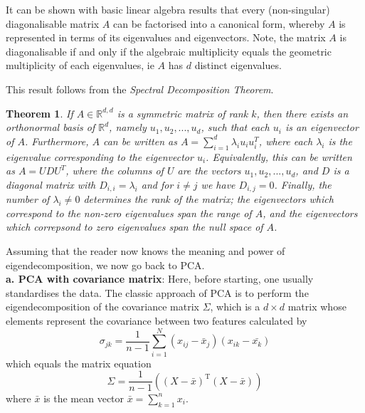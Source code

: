 \documentclass[journal, a4paper]{IEEEtran}
\newtheorem{theorem}{Theorem}[section]
\begin{document}
It can be shown with basic linear algebra results that every (non-singular) diagonalisable matrix \( A \) can be factorised into a canonical form, whereby \( A \) is represented in terms of its eigenvalues and eigenvectors.
Note, the matrix \( A \) is diagonalisable if and only if the algebraic multiplicity equals the geometric multiplicity of each eigenvalues, ie \( A \) has \( d \) distinct eigenvalues.

This result follows from the \textit{Spectral Decomposition Theorem}. 
\begin{theorem}\label{spectralthm}
	If \( A \in \mathbb{R}^{d,d}\) is a symmetric matrix of rank \( k \), then there exists an orthonormal basis of \( \mathbb{R}^d \), namely \( u_{1}, u_{2}, ..., u_{d} \), such that each \( u_{i} \) is an eigenvector of \( A \). Furthermore, \( A \) can be written as \( A = \sum_{i=1}^{d} \lambda_{i} u_{i} u_{i}^T \), where each \( \lambda_{i} \) is the eigenvalue corresponding to the eigenvector \( u_{i} \). Equivalently, this can be written as \( A = U D U^T \), where the columns of \( U \) are the vectors \( u_{1}, u_{2}, ..., u_{d} \), and \( D \) is a diagonal matrix with \( D_{i,i} = \lambda_{i} \) and for \( i \neq j \) we have \( D_{i,j} = 0 \). Finally, the number of \( \lambda_{i} \neq 0 \) determines the rank of the matrix; the eigenvectors which correspond to the non-zero eigenvalues span the range of \( A \), and the eigenvectors which correpsond to zero eigenvalues span the null space of \( A \).
\end{theorem}

Assuming that the reader now knows the meaning and power of eigendecomposition, we now go back to PCA.\\
\textbf{a. PCA with covariance matrix}:
Here, before starting, one usually standardises the data. %
The classic approach of PCA is to perform the eigendecomposition of the covariance matrix \( \Sigma \), which is a \( d \times d \) matrix whose elements represent the covariance between two features calculated by 
\[
\sigma_{jk} = \frac{1}{n-1} \sum_{i=1}^{N} (x_{ij} - \bar{x}_{j}) (x_{ik} - \bar{x_{k}})
\]
which equals the matrix equation
\[
\Sigma = \frac{1}{n-1} ( (X - \bar{x})^{\text{T}} (X - \bar{x}) )
\]
where \( \bar{x }\) is the mean vector \( \bar{x}= \sum_{k=1}^{n} x_{i}  \).
\end{document}
